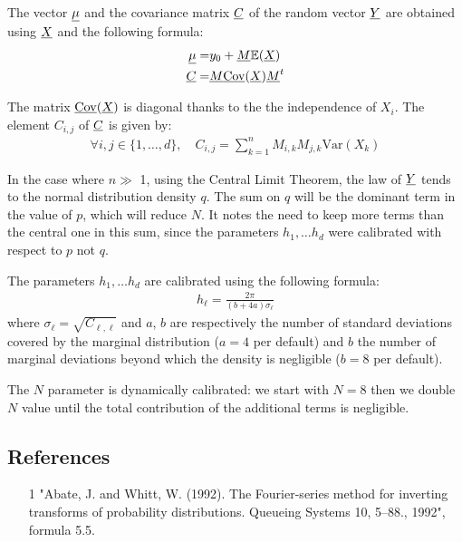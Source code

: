 The vector ${\underline{\mu}}$ and the covariance matrix ${\underline{C}}$ of the random vector ${\underline{Y}}$ are obtained using ${\underline{X}}$ and the following formula:
\begin{align}
  {\underline{\mu}}=& y_0 + {\underline{M}}\mathbb{E}({\underline{X}})\\
  {\underline{C}}=&{\underline{M}}{\underline{\mathrm{Cov}}}({\underline{X}}){\underline{M}}^t\\
\end{align}

The matrix ${\underline{\mathrm{Cov}}}({\underline{X}})$ is diagonal thanks to the the independence of $X_i$. 
The element $C_{i,j}$ of ${\underline{C}}$ is given by:
\begin{align}
\forall i,j\in\{1,\hdots,d\},\quad C_{i,j}=\sum_{k=1}^nM_{i,k}M_{j,k}\mathrm{Var}(X_k)
\end{align}

In the case where $n \gg $ 1, using the Central Limit Theorem, the law of ${\underline{Y}} $ tends to the normal distribution density $q$. 
The sum on $q$ will be the dominant term in the value of $p$, which will reduce $N$. 
It notes the need to keep more terms than the central one in this sum, since the parameters $ h_1, \dots  h_d$ were calibrated 
with respect to $p$ not $q$.

The parameters $h_1, \dots  h_d$ are calibrated using the following formula:
\begin{align}
  h_\ell = \frac{2\pi}{(b+4a)\sigma_\ell}
\end{align}
where $\sigma_\ell=\sqrt{C_{\ell,\ell}}$ and $a$, $b$ are respectively the number of standard deviations covered by the marginal distribution 
($a=4$ per default) and $b$ the number of marginal deviations beyond which the density is negligible ($b=​​8$ per default).

The $N$ parameter is dynamically calibrated: we start with $N=8$ then we double $N$ value until the total contribution of the additional terms is negligible.

\subsection{References}\label{ref}
\begin{itemize}
  \item[1] "Abate, J. and Whitt, W. (1992). The Fourier-series method for inverting transforms of probability distributions. Queueing Systems 10, 5--88., 1992",
        formula 5.5.
\end{itemize}

